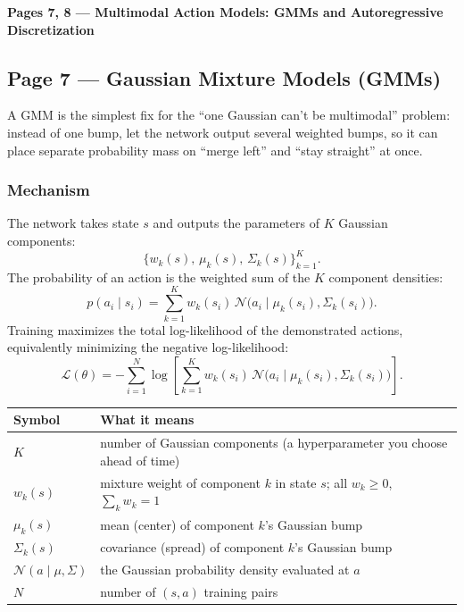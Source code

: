 \bigskip

\textbf{Pages 7, 8 --- Multimodal Action Models: GMMs and Autoregressive Discretization}

\subsection*{Page 7 --- Gaussian Mixture Models (GMMs)}

A GMM is the simplest fix for the ``one Gaussian can't be multimodal'' problem: instead of one bump, let the network output several weighted bumps, so it can place separate probability mass on ``merge left'' and ``stay straight'' at once.

\subsubsection*{Mechanism}

The network takes state $s$ and outputs the parameters of $K$ Gaussian components:
\[
\{w_k(s),\, \mu_k(s),\, \Sigma_k(s)\}_{k=1}^K.
\]
The probability of an action is the weighted sum of the $K$ component densities:
\[
p(a_i \mid s_i) = \sum_{k=1}^{K} w_k(s_i)\, \mathcal{N}\big(a_i \mid \mu_k(s_i), \Sigma_k(s_i)\big).
\]
Training maximizes the total log-likelihood of the demonstrated actions, equivalently minimizing the negative log-likelihood:
\[
\mathcal{L}(\theta) = -\sum_{i=1}^{N} \log\left[\sum_{k=1}^{K} w_k(s_i)\, \mathcal{N}\big(a_i \mid \mu_k(s_i), \Sigma_k(s_i)\big)\right].
\]

\begin{center}
\begin{tabular}{@{}ll@{}}
\toprule
Symbol & What it means \\
\midrule
$K$ & number of Gaussian components (a hyperparameter you choose ahead of time) \\
$w_k(s)$ & mixture weight of component $k$ in state $s$; all $w_k \ge 0$, $\sum_k w_k = 1$ \\
$\mu_k(s)$ & mean (center) of component $k$'s Gaussian bump \\
$\Sigma_k(s)$ & covariance (spread) of component $k$'s Gaussian bump \\
$\mathcal{N}(a \mid \mu,\Sigma)$ & the Gaussian probability density evaluated at $a$ \\
$N$ & number of $(s,a)$ training pairs \\
\bottomrule
\end{tabular}
\end{center}

